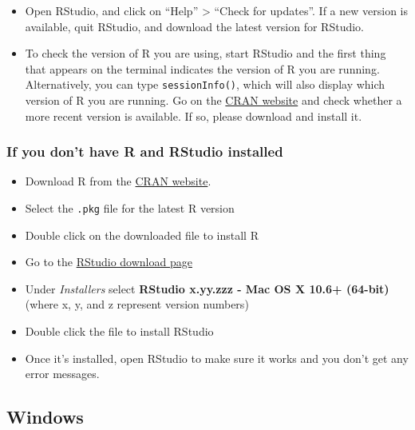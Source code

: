 \documentclass[
]{book}
\providecommand{\tightlist}{%
  \setlength{\itemsep}{0pt}\setlength{\parskip}{0pt}}
\begin{document}
\begin{itemize}
\tightlist
\item
  Open RStudio, and click on ``Help'' \textgreater{} ``Check for updates''. If a new version is
  available, quit RStudio, and download the latest version for RStudio.
\item
  To check the version of R you are using, start RStudio and the first thing
  that appears on the terminal indicates the version of R you are running. Alternatively, you can type \texttt{sessionInfo()}, which will also display which version of R you are running. Go on
  the \href{https://cran.r-project.org/bin/macosx/}{CRAN website} and check
  whether a more recent version is available. If so, please download and install
  it.
\end{itemize}

\hypertarget{if-you-dont-have-r-and-rstudio-installed}{%
\subsubsection*{If you don't have R and RStudio installed}\label{if-you-dont-have-r-and-rstudio-installed}}

\begin{itemize}
\tightlist
\item
  Download R from
  the \href{http://cran.r-project.org/bin/macosx}{CRAN website}.
\item
  Select the \texttt{.pkg} file for the latest R version
\item
  Double click on the downloaded file to install R
\item
  Go to the \href{https://www.rstudio.com/products/rstudio/download/\#download}{RStudio download page}
\item
  Under \emph{Installers} select \textbf{RStudio x.yy.zzz - Mac OS X 10.6+ (64-bit)}
  (where x, y, and z represent version numbers)
\item
  Double click the file to install RStudio
\item
  Once it's installed, open RStudio to make sure it works and you don't get any
  error messages.
\end{itemize}

\hypertarget{windows}{%
\subsection*{Windows}\label{windows}}
\end{document}
